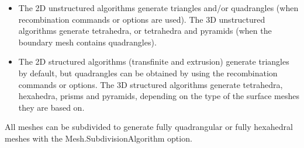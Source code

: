 \documentclass[dvipdfmx, 9pt, a4paper]{article}
\numberwithin{equation}{section}
\begin{document}
\begin{itemize}
\item The 2D unstructured algorithms generate triangles and/or quadrangles (when recombination commands or options are used). The 3D unstructured algorithms generate tetrahedra, or tetrahedra and pyramids (when the boundary mesh contains quadrangles).
\item The 2D structured algorithms (transfinite and extrusion) generate triangles by default, but quadrangles can be obtained by using the recombination commands or options. The 3D structured algorithms generate tetrahedra, hexahedra, prisms and pyramids, depending on the type of the surface meshes they are based on.
\end{itemize}
All meshes can be subdivided to generate fully quadrangular or fully hexahedral meshes with the Mesh.SubdivisionAlgorithm option.
\end{document}
